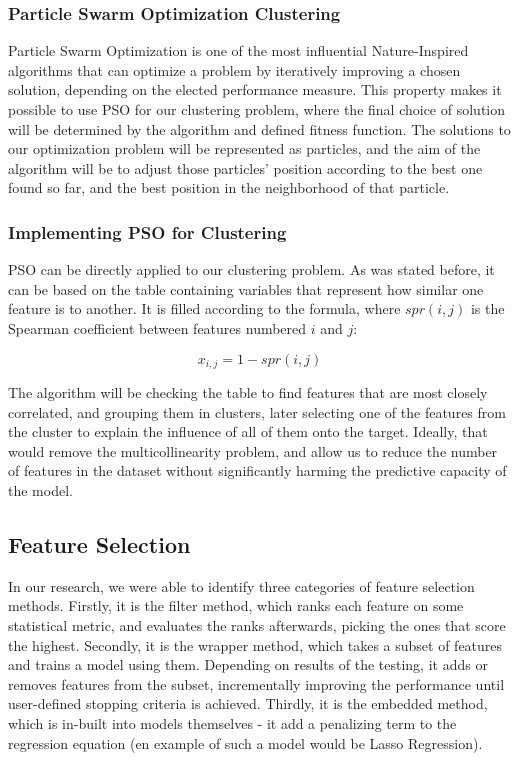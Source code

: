 \documentclass[conference]{IEEEtran}
\begin{document}
\subsubsection{Particle Swarm Optimization Clustering}

Particle Swarm Optimization is one of the most influential Nature-Inspired algorithms that can optimize a problem by iteratively improving a chosen solution, depending on the elected performance measure\cite{ballardini2018tutorial}. This property makes it possible to use PSO for our clustering problem, where the final choice of solution will be determined by the algorithm and defined fitness function. The solutions to our optimization problem will be represented as particles, and the aim of the algorithm will be to adjust those particles' position according to the best one found so far, and the best position in the neighborhood of that particle.

\subsubsection{Implementing PSO for Clustering}

PSO can be directly applied to our clustering problem. As was stated before, it can be based on the table containing variables that represent how similar one feature is to another. It is filled according to the formula, where $spr(i, j)$ is the Spearman coefficient between features numbered $i$ and $j$:

\begin{equation}
	x_{i, j}=1-spr(i, j)
\end{equation}

The algorithm will be checking the table to find features that are most closely correlated, and grouping them in clusters, later selecting one of the features from the cluster to explain the influence of all of them onto the target. Ideally, that would remove the multicollinearity problem, and allow us to reduce the number of features in the dataset without significantly harming the predictive capacity of the model.

\subsection{Feature Selection}

In our research, we were able to identify three categories of feature selection methods. Firstly, it is the filter method, which ranks each feature on some statistical metric, and evaluates the ranks afterwards, picking the ones that score the highest. Secondly, it is the wrapper method, which takes a subset of features and trains a model using them. Depending on results of the testing, it adds or removes features from the subset, incrementally improving the performance until user-defined stopping criteria is achieved. Thirdly, it is the embedded method, which is in-built into models themselves - it add a penalizing term to the regression equation (en example of such a model would be Lasso Regression).\\
\end{document}
